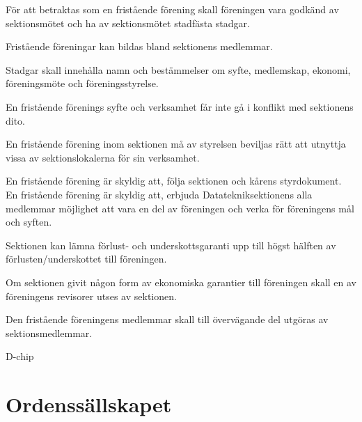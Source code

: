 \documentclass[stadgar]{dsekprotokoll}
\begin{document}
\begin{stadgeavsnitt}


För att betraktas som en fristående förening skall föreningen vara godkänd
av sektionsmötet och ha av sektionsmötet stadfästa stadgar.


Fristående föreningar kan bildas bland sektionens medlemmar.


Stadgar skall innehålla namn och bestämmelser om syfte, medlemskap,
ekonomi, föreningsmöte och föreningsstyrelse.


En fristående förenings syfte och verksamhet får inte gå i konflikt med
sektionens dito.


En fristående förening inom sektionen må av styrelsen beviljas rätt att
utnyttja vissa av sektionslokalerna för sin verksamhet.


En fristående förening är skyldig att, följa sektionen och kårens styrdokument. En fristående förening är skyldig att, erbjuda Datatekniksektionens alla medlemmar möjlighet att vara en del av föreningen och verka för föreningens mål och syften.


Sektionen kan lämna förlust- och underskottsgaranti upp till högst hälften
av förlusten/underskottet till föreningen.


Om sektionen givit någon form av ekonomiska garantier till föreningen skall
en av föreningens revisorer utses av sektionen.


Den fristående föreningens medlemmar skall till övervägande del utgöras av
sektionsmedlemmar.

D-chip \\

\end{stadgeavsnitt}

\section{Ordenssällskapet}
\end{document}
